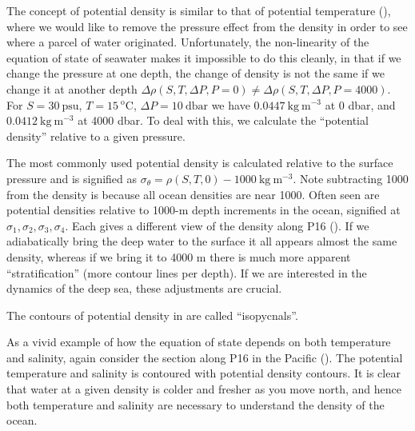 The concept of potential density is similar to that of potential temperature (), where we would like to remove the pressure effect from the density in order to see where a parcel of water originated.  Unfortunately, the non-linearity of the equation of state of seawater makes it impossible to do this cleanly, in that if we change the pressure at one depth, the change of density is not the same if we change it at another depth $\Delta \rho(S, T, \Delta P, P=0) \neq \Delta \rho(S, T, \Delta P, P=4000)$.  For $S=30\ \mathrm{psu}$, $T=15\ \mathrm{^oC}$, $\Delta P = 10\ \mathrm{dbar}$ we have $0.0447\ \mathrm{kg\ m^{-3}}$ at 0 dbar, and  $0.0412\ \mathrm{kg\ m^{-3}}$  at 4000 dbar.  To deal with this, we calculate the ``potential density'' relative to a given pressure.  

The most commonly used potential density is calculated relative to  the surface pressure and is signified as $\sigma_{\theta} = \rho(S, T, 0) - 1000\ \mathrm{kg\ m^{-3}}$.  Note subtracting 1000 from the density is because all ocean densities are near 1000.  Often seen are potential densities relative to 1000-m depth increments in the ocean, signified at $\sigma_1, \sigma_2, \sigma_3, \sigma_4$.  Each gives a  different view of the density along P16 ().  If we adiabatically bring the deep water to the surface it all appears almost the same density, whereas if we bring it to 4000 m there is much more apparent ``stratification'' (more contour lines per depth).  If we are interested in the dynamics of the deep sea, these adjustments are crucial.  

The contours of potential density in  are called ``isopycnals''.  

As a vivid example of how the equation of state depends on both temperature and salinity, again consider the section along P16 in the Pacific ().  The potential temperature and salinity is contoured with potential density contours.  It is clear that water at a given density is colder and fresher as you move north, and hence both temperature and salinity are necessary to understand the density of the ocean.  

